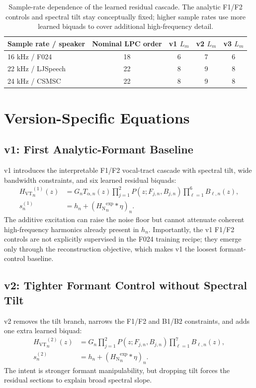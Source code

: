 \documentclass[11pt]{article}
\newcommand{\src}{s}
\newcommand{\harm}{h}
\newcommand{\noise}{\eta}
\newcommand{\vt}{H_{\mathrm{VT}}}
\newcommand{\nfilt}{H_{\mathrm{N}}}
\newcommand{\biquad}{B}
\newcommand{\pole}{P}
\begin{document}
\begin{table}[H]
\centering
\small
\begin{tabular}{@{}lcccc@{}}
\toprule
Sample rate / speaker & Nominal LPC order & v1 $L_m$ & v2 $L_m$ & v3 $L_m$ \\
\midrule
16 kHz / F024 & 18 & 6 & 7 & 6 \\
22 kHz / LJSpeech & 22 & 8 & 9 & 8 \\
24 kHz / CSMSC & 22 & 8 & 9 & 8 \\
\bottomrule
\end{tabular}
\caption{Sample-rate dependence of the learned residual cascade. The analytic
F1/F2 controls and spectral tilt stay conceptually fixed; higher sample rates
use more learned biquads to cover additional high-frequency detail.}
\end{table}

\section{Version-Specific Equations}

\subsection{v1: First Analytic-Formant Baseline}

v1 introduces the interpretable F1/F2 vocal-tract cascade with spectral tilt,
wide bandwidth constraints, and six learned residual biquads:
\begin{align}
  {\vt}^{(1)}_n(z)
  &=
  G_n T_{\alpha,n}(z)
  \prod_{j=1}^{2}\pole(z;F_{j,n},B_{j,n})
  \prod_{\ell=1}^{6}\biquad_{\ell,n}(z),\\
  \src^{(1)}_n
  &=
  \harm_n + ({\nfilt}^{\exp}_n * \noise)_n.
\end{align}
The additive excitation can raise the noise floor but cannot attenuate
coherent high-frequency harmonics already present in $\harm_n$. Importantly,
the v1 F1/F2 controls are not explicitly supervised in the F024 training
recipe; they emerge only through the reconstruction objective, which makes v1
the loosest formant-control baseline.

\subsection{v2: Tighter Formant Control without Spectral Tilt}

v2 removes the tilt branch, narrows the F1/F2 and B1/B2 constraints, and adds
one extra learned biquad:
\begin{align}
  {\vt}^{(2)}_n(z)
  &=
  G_n
  \prod_{j=1}^{2}\pole(z;F_{j,n},B_{j,n})
  \prod_{\ell=1}^{7}\biquad_{\ell,n}(z),\\
  \src^{(2)}_n
  &=
  \harm_n + ({\nfilt}^{\exp}_n * \noise)_n.
\end{align}
The intent is stronger formant manipulability, but dropping tilt forces the
residual sections to explain broad spectral slope.
\end{document}
